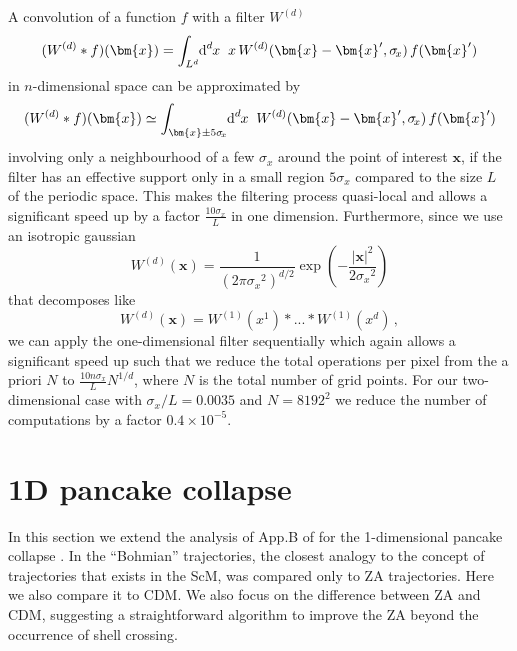 \documentclass[twocolumn, nofootinbib, showpacs, superscriptaddress]{revtex4-1}
\newcommand{\sigx}{{\sigma_{\! x}}}
\newcommand{\vol}[2]{\hspace{-0.8mm}\mbox{$\text{d}^{\hspace{-0.0mm}#1}$}\hspace{-0.2mm}#2\hspace{0.8mm}\ }
\renewcommand{\v}[1]{\bm{#1} }
\begin{document}
A convolution of a function $f$ with a filter $W^{(d)}$ 
 $$(W^{(d)}*f)(\v{x}) = \int_{L^d} \vol{d}{x} x\, W^{(d)}(\v{x}-\v{x}', \sigx)\, f(\v{x}') $$ in $n$-dimensional space can be approximated by  $$(W^{(d)}*f)(\v{x}) \simeq  \int_{\v{x}\pm 5\sigx} \vol{d}{x} W^{(d)}(\v{x}-\v{x}', \sigx)\, f(\v{x}') $$ involving only a neighbourhood of a few $\sigx$ around the point of interest $\v{x}$, if the filter has an effective support only in a small  region $5\sigx$ compared to the size $L$ of the periodic space. This makes the filtering process quasi-local and allows a significant speed up by a factor $\frac{10 \sigx}{L}$ in one dimension. 
Furthermore, since we use an isotropic gaussian $$W^{(d)}(\v{x})=\frac{1}{(2\pi \sigx^2)^{d/2}}\exp\left( - \frac{|\v{x}|^2}{2 \sigx^2} \right)$$ that decomposes like $$W^{(d)}(\v{x}) = W^{(1)}(x^1)* ... * W^{(1)}(x^d)\,,$$
we can apply the one-dimensional filter sequentially which again allows a significant speed up such that we reduce the total operations per pixel from the a priori $N$ to $ \frac{10 n \sigx}{L} N^{1/d}$, where $N$ is the total number of grid points. For our two-dimensional case with $\sigx/L = 0.0035$ and $ N=8192^2$ we reduce the number of computations by a factor $0.4\times10^{-5}$.

\section{1D pancake collapse}
\label{sec:CDM1D}

In this section we extend the analysis of App.B of \cite{UhlemannKoppHaugg2014} for the 1-dimensional pancake collapse \cite{Zeldovich70,KS83,GoudaNakamura1989,YanoGouda1998,TatekawaMaeda2001}. 
In \cite{UhlemannKoppHaugg2014} the ``Bohmian'' trajectories, the closest analogy to the concept of trajectories that exists in the ScM, was compared only to ZA trajectories. Here we also compare it to CDM.
We also focus on the difference between ZA and CDM, suggesting a straightforward algorithm to improve the ZA beyond the occurrence of shell crossing.
\end{document}

